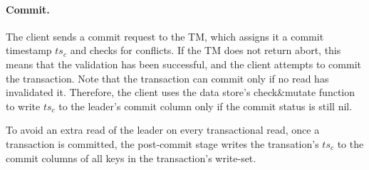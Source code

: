 

\paragraph{Commit.}
The client sends a commit request to the TM, which assigns it a commit timestamp $ts_c$ and checks for conflicts. 
If the TM does not return abort, this means that the validation has been successful, and the client 
attempts to commit the transaction. 
Note that the transaction can commit only if no read has invalidated it. Therefore, the client uses 
the data store's check\&mutate function to write $ts_c$ to the leader's commit column 
only if the commit status is still nil.

To avoid an extra read of the leader on every transactional read, once a transaction is committed, the post-commit stage writes 
the transation's $ts_c$ to the commit columns of all keys in  the transaction's write-set. 


